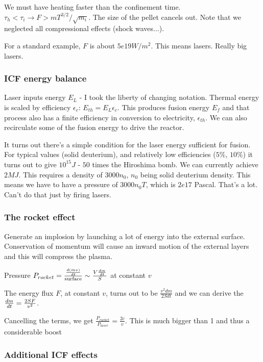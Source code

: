 \documentclass[PlasmaNotes.tex]{subfiles}
\begin{document}
We must have heating faster than the confinement time. $\tau_h < \tau_i \rightarrow F >  m T^{3/2} / \sqrt{m_i}$. The size of the pellet cancels out. Note that we neglected all compressional effects (shock waves...).

For a standard example, $F$ is about $5e19 W/m^2$. This means lasers. Really big lasers.

\subsubsection{ICF energy balance}

Laser inputs energy $E_L$ - I took the liberty of changing notation. Thermal energy is scaled by efficiency $\epsilon_c$: $E_{th}=E_L \epsilon_c$. This produces fusion energy $E_f$ and that process also has a finite efficiency in conversion to electricity, $\epsilon_{th}$. We can also recirculate some of the fusion energy to drive the reactor.


It turns out there's a simple condition for the laser energy sufficient for fusion. For typical values (solid deuterium), and relatively low efficiencies ($5\%$, $10\%$) it turns out to give $10^{15} J$ - $50$ times the Hiroshima bomb. We can currently achieve $2 MJ$. This requires a density of $3000 n_0$, $n_0$ being solid deuterium density. This means we have to have a pressure of $3000 n_0 T$, which is $2e17$ Pascal. That's a lot. Can't do that just by firing lasers.

\subsubsection{The rocket effect}

Generate an implosion by launching a lot of energy into the external surface. Conservation of momentum will cause an inward motion of the external layers and this will compress the plasma.

Pressure $P_{rocket} = \frac{\frac{d (mv)}{d t}}{\text{surface}} \sim \frac{V \frac{d m}{d t}}{S}$ at constant $v$

The energy flux $F$, at constant $v$, turns out to be $\frac{v^2 dm}{2 S dt}$ and we can derive the $\frac{d m}{d t} = \frac{2 S F}{v^2}$.

Cancelling the terms, we get $\frac{P_{rocket}}{P_{laser}} = \frac{2c}{v}$. This is much bigger than 1 and thus a considerable boost

\subsubsection{Additional ICF effects}
\end{document}
